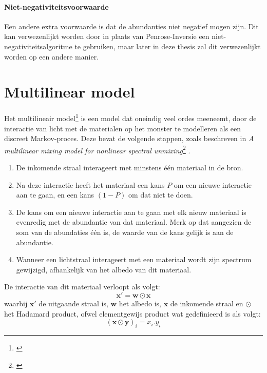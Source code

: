 \documentclass[12pt]{report}
\newcommand{\footcite}[1]{\cite{#1}\let\thefootnote\relax \footnote{\cite{#1} \bibentry{#1}} }
\begin{document}
\subsubsection{Niet-negativiteitsvoorwaarde}

Een andere extra voorwaarde is dat de abundanties niet negatief mogen zijn. Dit kan verwezenlijkt worden door in plaats van Penrose-Inversie een niet-negativiteitsalgoritme te gebruiken, maar later in deze thesis zal dit verwezenlijkt worden op een andere manier.


\chapter{Multilinear model}\label{mlm}


Het multilineair model\footcite{mlinmix} is een model dat oneindig veel ordes meeneemt, door de interactie van licht met de materialen op het monster te modelleren als een discreet Markov-proces. Deze bevat de volgende stappen, zoals beschreven in \textit{A multilinear mixing model for nonlinear spectral unmixing}\footcite{mlinmix}.
\begin{enumerate}
\item De inkomende straal interageert met minstens \'e\'en materiaal in de bron.
\item Na deze interactie heeft het materiaal een kans $P$ om een nieuwe interactie aan te gaan, en een kans $(1-P)$ om dat niet te doen.
\item De kans om een nieuwe interactie aan te gaan met elk nieuw materiaal is evenredig met de abundantie van dat materiaal. Merk op dat aangezien de som van de abundaties \'e\'en is, de waarde van de kans gelijk is aan de abundantie.
\item Wanneer een lichtstraal interageert met een materiaal wordt zijn spectrum gewijzigd, afhankelijk van het albedo van dit materiaal.
\end{enumerate}

De interactie van dit materiaal verloopt als volgt:
\begin{equation}
\bm{x}' = \bm{w} \odot \bm{x}
\end{equation}
waarbij $\bm{x}'$ de uitgaande straal is, $\bm{w}$ het albedo is, $\bm{x}$ de inkomende straal en $\odot$ het Hadamard product, ofwel elementgewijs product wat gedefinieerd is als volgt:
\begin{equation}
\left(\bm{x} \odot \bm{y}\right)_i = x_i.y_i
\end{equation}
\end{document}
